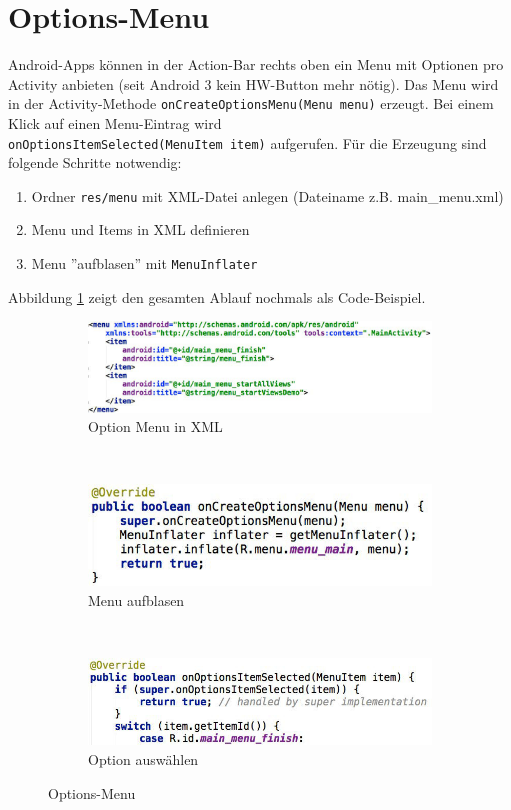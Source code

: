 \section{Options-Menu}

Android-Apps können in der Action-Bar rechts oben ein Menu mit Optionen pro Activity anbieten (seit Android 3 kein HW-Button mehr nötig). Das Menu wird in der Activity-Methode \texttt{onCreateOptionsMenu(Menu menu)} erzeugt. Bei einem Klick auf einen Menu-Eintrag wird \\ \texttt{onOptionsItemSelected(MenuItem item)} aufgerufen. Für die Erzeugung sind folgende Schritte notwendig:
\begin{enumerate}
	\item Ordner \texttt{res/menu} mit XML-Datei anlegen (Dateiname z.B. main\_menu.xml)
	\item Menu und Items in XML definieren
	\item Menu ''aufblasen'' mit \texttt{MenuInflater}
\end{enumerate}
Abbildung \ref{fig:option-menu} zeigt den gesamten Ablauf nochmals als Code-Beispiel.
\begin{figure}
	\centering
	\begin{subfigure}[b]{0.48\textwidth}
		\includegraphics[width=\textwidth]{fig/option-menu-xml}
		\caption{Option Menu in XML}
	\end{subfigure}
	~
	\begin{subfigure}[b]{0.48\textwidth}
		\includegraphics[width=\textwidth]{fig/option-menu-create}
		\caption{Menu aufblasen}
	\end{subfigure}
	~
	\begin{subfigure}[b]{0.48\textwidth}
		\includegraphics[width=\textwidth]{fig/option-menu-event}
		\caption{Option auswählen}
	\end{subfigure}
	\caption{Options-Menu}
	\label{fig:option-menu}
\end{figure}

